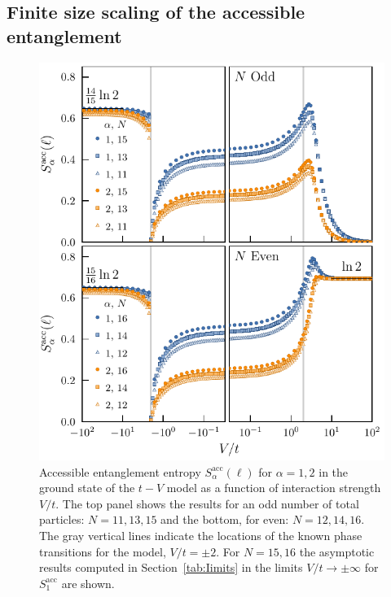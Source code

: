 \subsection{Finite size scaling of the accessible entanglement}


%
\begin{figure}[htp]
\begin{center}
\includegraphics[width=1.0\columnwidth]{operationalEntanglementEntropies_SOP5.pdf}
\end{center}
\caption{Accessible entanglement entropy $S_{\alpha}^{\mathrm{acc}}(\ell)$ for $\alpha = 1, 2$ in the ground state of the $t-V$ model as a function of interaction strength $V/t$. The top panel shows the results for an odd number of total particles: $N=11,13,15$ and the bottom, for even: $N=12,14,16$. The gray vertical lines indicate the locations of the known phase transitions for the model, $V/t = \pm 2$. For $N=15,16$ the asymptotic results computed in Section~\ref{tab:Iimits} in the limits $V/t \to \pm \infty$ for $S_{1}^{\mathrm{acc}}$ are shown. }
\label{fig:OEE}
 \end{figure}

